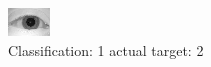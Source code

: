\begin{figure}[h!]
\begin{center}
\includegraphics[width=0.60\columnwidth]{figures/ID976_class_1_target_2.png}
\end{center}
\caption{ Classification: 1 actual target: 2}
\label{fig:ID976_class_1_target_2}
\end{figure}
